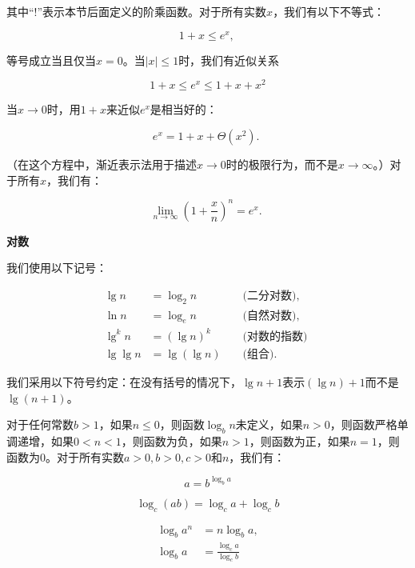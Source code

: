 \documentclass[lang=cn,newtx,10pt,scheme=chinese]{elegantbook}
\begin{document}
其中``!''表示本节后面定义的阶乘函数。对于所有实数$x$，我们有以下不等式：

\begin{equation}\label{eq:3.14}
1+x \leq e^x \text {, }
\end{equation}

等号成立当且仅当$x=0$。当$|x| \leq 1$时，我们有近似关系

\begin{equation}\label{eq:3.15}
1+x \leq e^x \leq 1+x+x^2
\end{equation}

当$x \rightarrow 0$时，用$1+x$来近似$e^x$是相当好的：

$$
e^x=1+x+\Theta\left(x^2\right) \text {. }
$$

（在这个方程中，渐近表示法用于描述$x \rightarrow 0$时的极限行为，而不是$x \rightarrow \infty$。）对于所有$x$，我们有：

\begin{equation}\label{eq:3.16}
\lim _{n \rightarrow \infty}\left(1+\frac{x}{n}\right)^n=e^x \text {. }
\end{equation}

\textbf{对数}

我们使用以下记号：

$$
\begin{aligned}
\lg n & =\log _2 n & & \text { (二分对数), } \\
\ln n & =\log _e n & & \text { (自然对数), } \\
\lg ^k n & =(\lg n)^k & & \text { (对数的指数) } \\
\lg \lg n & =\lg (\lg n) & & \text { (组合). }
\end{aligned}
$$

我们采用以下符号约定：在没有括号的情况下，$\lg n+1$表示$(\lg n)+1$而不是$\lg (n+1)$。

对于任何常数$b>1$，如果$n \leq 0$，则函数$\log _b n$未定义，如果$n>0$，则函数严格单调递增，如果$0<n<1$，则函数为负，如果$n>1$，则函数为正，如果$n=1$，则函数为0。对于所有实数$a>0, b>0, c>0$和$n$，我们有：

\begin{equation}\label{eq:3.17}
a=b^{\log _b a}
\end{equation}

\begin{equation}\label{eq:3.18}
\log _c(a b)=\log _c a+\log _c b
\end{equation}

\begin{equation}\label{eq:3.19}
\begin{aligned}
\log _b a^n&=n \log _b a, \\
\log _b a&=\frac{\log _c a}{\log _c b}
\end{aligned}
\end{equation}
\end{document}
